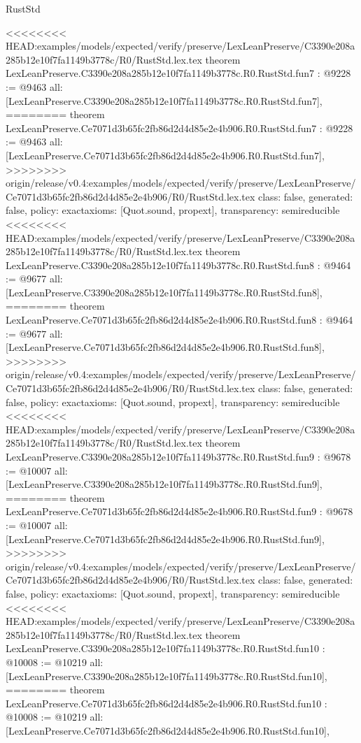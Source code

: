 \begin{lexlean}{RustStd}
\begin{coremodule}
{\begin{coremodule}
{{{{{{{{{{}
<<<<<<<< HEAD:examples/models/expected/verify/preserve/LexLeanPreserve/C3390e208a285b12e10f7fa1149b3778c/R0/RustStd.lex.tex
theorem LexLeanPreserve.C3390e208a285b12e10f7fa1149b3778c.R0.RustStd.fun7 : @9228 := @9463 {
  all: [LexLeanPreserve.C3390e208a285b12e10f7fa1149b3778c.R0.RustStd.fun7],
========
theorem LexLeanPreserve.Ce7071d3b65fc2fb86d2d4d85e2e4b906.R0.RustStd.fun7 : @9228 := @9463 {
  all: [LexLeanPreserve.Ce7071d3b65fc2fb86d2d4d85e2e4b906.R0.RustStd.fun7],
>>>>>>>> origin/release/v0.4:examples/models/expected/verify/preserve/LexLeanPreserve/Ce7071d3b65fc2fb86d2d4d85e2e4b906/R0/RustStd.lex.tex
  class: false,
  generated: false,
  policy: exact{axioms: [Quot.sound, propext]},
  transparency: semireducible
}
<<<<<<<< HEAD:examples/models/expected/verify/preserve/LexLeanPreserve/C3390e208a285b12e10f7fa1149b3778c/R0/RustStd.lex.tex
theorem LexLeanPreserve.C3390e208a285b12e10f7fa1149b3778c.R0.RustStd.fun8 : @9464 := @9677 {
  all: [LexLeanPreserve.C3390e208a285b12e10f7fa1149b3778c.R0.RustStd.fun8],
========
theorem LexLeanPreserve.Ce7071d3b65fc2fb86d2d4d85e2e4b906.R0.RustStd.fun8 : @9464 := @9677 {
  all: [LexLeanPreserve.Ce7071d3b65fc2fb86d2d4d85e2e4b906.R0.RustStd.fun8],
>>>>>>>> origin/release/v0.4:examples/models/expected/verify/preserve/LexLeanPreserve/Ce7071d3b65fc2fb86d2d4d85e2e4b906/R0/RustStd.lex.tex
  class: false,
  generated: false,
  policy: exact{axioms: [Quot.sound, propext]},
  transparency: semireducible
}
<<<<<<<< HEAD:examples/models/expected/verify/preserve/LexLeanPreserve/C3390e208a285b12e10f7fa1149b3778c/R0/RustStd.lex.tex
theorem LexLeanPreserve.C3390e208a285b12e10f7fa1149b3778c.R0.RustStd.fun9 : @9678 := @10007 {
  all: [LexLeanPreserve.C3390e208a285b12e10f7fa1149b3778c.R0.RustStd.fun9],
========
theorem LexLeanPreserve.Ce7071d3b65fc2fb86d2d4d85e2e4b906.R0.RustStd.fun9 : @9678 := @10007 {
  all: [LexLeanPreserve.Ce7071d3b65fc2fb86d2d4d85e2e4b906.R0.RustStd.fun9],
>>>>>>>> origin/release/v0.4:examples/models/expected/verify/preserve/LexLeanPreserve/Ce7071d3b65fc2fb86d2d4d85e2e4b906/R0/RustStd.lex.tex
  class: false,
  generated: false,
  policy: exact{axioms: [Quot.sound, propext]},
  transparency: semireducible
}
<<<<<<<< HEAD:examples/models/expected/verify/preserve/LexLeanPreserve/C3390e208a285b12e10f7fa1149b3778c/R0/RustStd.lex.tex
theorem LexLeanPreserve.C3390e208a285b12e10f7fa1149b3778c.R0.RustStd.fun10 : @10008 := @10219 {
  all: [LexLeanPreserve.C3390e208a285b12e10f7fa1149b3778c.R0.RustStd.fun10],
========
theorem LexLeanPreserve.Ce7071d3b65fc2fb86d2d4d85e2e4b906.R0.RustStd.fun10 : @10008 := @10219 {
  all: [LexLeanPreserve.Ce7071d3b65fc2fb86d2d4d85e2e4b906.R0.RustStd.fun10],
}}}}}}}}}}}}}}
\end{coremodule}}
\end{coremodule}
\end{lexlean}
